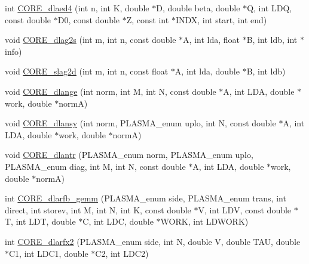 \begin{DoxyCompactItemize}
\item 
int \hyperlink{group__CORE__double_gab7b88d94f96333ae870c7fdafe41c194_gab7b88d94f96333ae870c7fdafe41c194}{C\+O\+R\+E\+\_\+dlaed4} (int n, int K, double $\ast$D, double beta, double $\ast$Q, int L\+D\+Q, const double $\ast$D0, const double $\ast$Z, const int $\ast$I\+N\+D\+X, int start, int end)
\item 
void \hyperlink{group__CORE__double_gad314c3ce1d85697c2edccd6763300e93_gad314c3ce1d85697c2edccd6763300e93}{C\+O\+R\+E\+\_\+dlag2s} (int m, int n, const double $\ast$A, int lda, float $\ast$B, int ldb, int $\ast$info)
\item 
void \hyperlink{group__CORE__double_ga0e4b82b2033ca8c4a3bdbfa6327810ab_ga0e4b82b2033ca8c4a3bdbfa6327810ab}{C\+O\+R\+E\+\_\+slag2d} (int m, int n, const float $\ast$A, int lda, double $\ast$B, int ldb)
\item 
void \hyperlink{group__CORE__double_ga1ecb4af5d609ccaca3c438134f1e6452_ga1ecb4af5d609ccaca3c438134f1e6452}{C\+O\+R\+E\+\_\+dlange} (int norm, int M, int N, const double $\ast$A, int L\+D\+A, double $\ast$work, double $\ast$norm\+A)
\item 
void \hyperlink{group__CORE__double_ga8b19aabbaa27e74346193ce1cda858b9_ga8b19aabbaa27e74346193ce1cda858b9}{C\+O\+R\+E\+\_\+dlansy} (int norm, P\+L\+A\+S\+M\+A\+\_\+enum uplo, int N, const double $\ast$A, int L\+D\+A, double $\ast$work, double $\ast$norm\+A)
\item 
void \hyperlink{group__CORE__double_gad604d5c2ee20d5e2c9f4e669e540bab2_gad604d5c2ee20d5e2c9f4e669e540bab2}{C\+O\+R\+E\+\_\+dlantr} (P\+L\+A\+S\+M\+A\+\_\+enum norm, P\+L\+A\+S\+M\+A\+\_\+enum uplo, P\+L\+A\+S\+M\+A\+\_\+enum diag, int M, int N, const double $\ast$A, int L\+D\+A, double $\ast$work, double $\ast$norm\+A)
\item 
int \hyperlink{group__CORE__double_gabd19ac0084a19fd2763defa6d3e94e94_gabd19ac0084a19fd2763defa6d3e94e94}{C\+O\+R\+E\+\_\+dlarfb\+\_\+gemm} (P\+L\+A\+S\+M\+A\+\_\+enum side, P\+L\+A\+S\+M\+A\+\_\+enum trans, int direct, int storev, int M, int N, int K, const double $\ast$V, int L\+D\+V, const double $\ast$T, int L\+D\+T, double $\ast$C, int L\+D\+C, double $\ast$W\+O\+R\+K, int L\+D\+W\+O\+R\+K)
\item 
int \hyperlink{group__CORE__double_ga80d7223148dcbf874885d5bb0707f231_ga80d7223148dcbf874885d5bb0707f231}{C\+O\+R\+E\+\_\+dlarfx2} (P\+L\+A\+S\+M\+A\+\_\+enum side, int N, double V, double T\+A\+U, double $\ast$C1, int L\+D\+C1, double $\ast$C2, int L\+D\+C2)
\item 

\end{DoxyCompactItemize}

